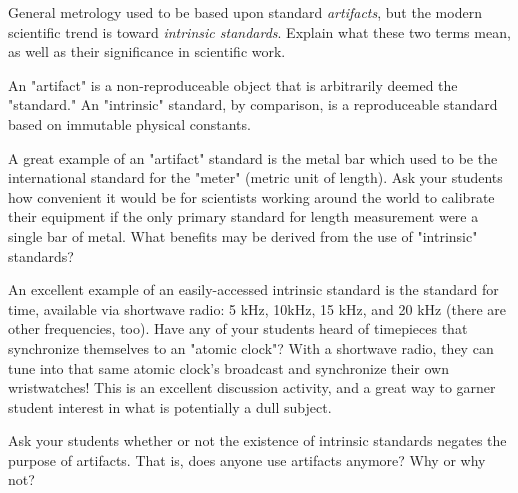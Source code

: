 

General metrology used to be based upon standard {\it artifacts}, but the modern scientific trend is toward {\it intrinsic standards}.  Explain what these two terms mean, as well as their significance in scientific work.







An "artifact" is a non-reproduceable object that is arbitrarily deemed the "standard."  An "intrinsic" standard, by comparison, is a reproduceable standard based on immutable physical constants.







A great example of an "artifact" standard is the metal bar which used to be the international standard for the "meter" (metric unit of length).  Ask your students how convenient it would be for scientists working around the world to calibrate their equipment if the only primary standard for length measurement were a single bar of metal.  What benefits may be derived from the use of "intrinsic" standards?

An excellent example of an easily-accessed intrinsic standard is the standard for time, available via shortwave radio: 5 kHz, 10kHz, 15 kHz, and 20 kHz (there are other frequencies, too).  Have any of your students heard of timepieces that synchronize themselves to an "atomic clock"?  With a shortwave radio, they can tune into that same atomic clock's broadcast and synchronize their own wristwatches!  This is an excellent discussion activity, and a great way to garner student interest in what is potentially a dull subject.

Ask your students whether or not the existence of intrinsic standards negates the purpose of artifacts.  That is, does anyone use artifacts anymore?  Why or why not?




